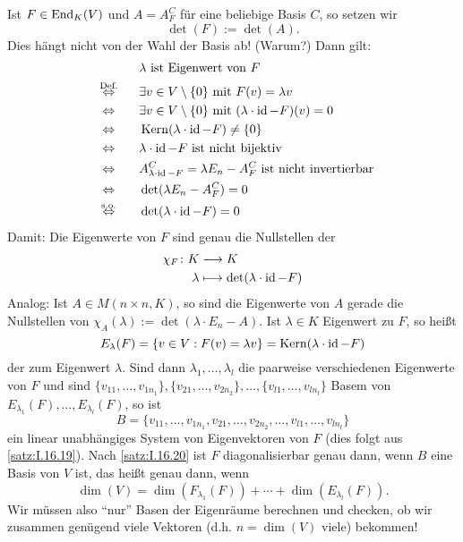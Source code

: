 Ist $F \in \operatorname{End}_K(V)$ und $A = A_F^C$ für eine beliebige Basis $C$, so setzen wir
\[
	\det(F) := \det(A).
\]
Dies hängt nicht von der Wahl der Basis ab! (Warum?)
Dann gilt:
\begin{align*}
	&\lambda \text{ ist Eigenwert von } F \\
\stack{\text{Def.}}{\Leftrightarrow} \quad &\exists v \in V \setminus \setzero \text{ mit } F(v) = \lambda v \\
\stack{}{\Leftrightarrow} \quad &\exists v \in V \setminus \setzero \text{ mit } (\lambda \cdot \id - F)(v) = 0 \\
\stack{}{\Leftrightarrow} \quad &\Kern(\lambda \cdot \id - F) \neq \setzero \\
\stack{}{\Leftrightarrow} \quad &\lambda \cdot \id-F \text{ ist nicht bijektiv} \\
\stack{}{\Leftrightarrow} \quad &A^C_{\lambda \cdot \id-F} = \lambda E_n - A_F^C \text{ ist nicht invertierbar} \\
\stack{}{\Leftrightarrow} \quad &\det(\lambda E_n - A_F^C) = 0 \\
\stack{\text{s.o.}}{\Leftrightarrow} \quad &\det(\lambda \cdot \id - F) = 0
\end{align*}
Damit: Die Eigenwerte von $F$ sind genau die Nullstellen der 
\begin{align*}
	\chi_F \colon K &\longrightarrow K \\
	\lambda &\longmapsto \det(\lambda \cdot \operatorname{id} - F)
\end{align*}
Analog: Ist $A \in M(n \times n,K)$, so sind die Eigenwerte von $A$ gerade die Nullstellen von $\chi_A(\lambda) := \det(\lambda \cdot E_n - A)$.
\newpage
{}
Ist $\lambda \in K$ Eigenwert zu $F$, so heißt
\[
	E_\lambda(F) = \{v \in V : F(v) = \lambda v\} = \operatorname{Kern}(\lambda \cdot \operatorname{id} - F)
\]
der  zum Eigenwert $\lambda$.
Sind dann $\lambda_1,\dots,\lambda_l$ die paarweise verschiedenen Eigenwerte von $F$ und sind $\{v_{11},\dots,v_{1n_1}\}, \{v_{21},\dots,v_{2n_2}\}, \dots, \{v_{l1},\dots,v_{ln_l}\}$ Basem von $E_{\lambda_1}(F), \dots, E_{\lambda_l}(F)$, so ist
\[
	B = \{v_{11},\dots,v_{1n_1},v_{21},\dots,v_{2n_2},\dots,v_{l1},\dots,v_{ln_l}\}
\]
ein linear unabhängiges System von Eigenvektoren von $F$ (dies folgt aus \autoref{satz:I.16.19}).
Nach \autoref{satz:I.16.20} ist $F$ diagonalisierbar genau dann, wenn $B$ eine Basis von $V$ ist, das heißt genau dann, wenn
\[
	\dim(V) = \dim(F_{\lambda_1}(F)) + \cdots + \dim(E_{\lambda_l}(F)).
\]
Wir müssen also \enquote{nur} Basen der Eigenräume berechnen und checken, ob wir zusammen genügend viele Vektoren (d.h. $n = \dim(V)$ viele) bekommen!

